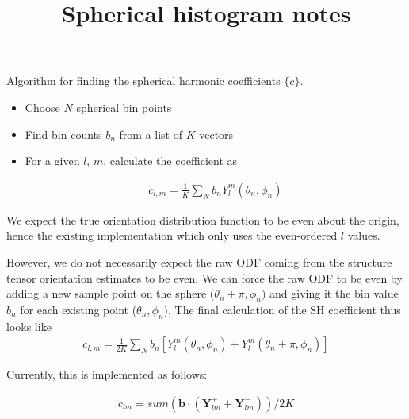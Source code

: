 \documentclass{article}
\title{Spherical histogram notes}
\date{}
\begin{document}
\maketitle

Algorithm for finding the spherical harmonic coefficients $\{c\}$. 

\begin{itemize}
\item Choose $N$ spherical bin points
\item Find bin counts $b_n$ from a list of $K$ vectors
\item For a given $l$, $m$, calculate the coefficient as
  
  \begin{align}
    c_{l,m} = \frac{1}{K}\sum_N b_n Y_{l}^{m}(\theta_n, \phi_n)
  \end{align}
\end{itemize}

We expect the true orientation distribution function to be even about the origin,
hence the existing implementation which only uses the even-ordered $l$ values.

However, we do not necessarily expect the raw ODF coming from the structure tensor
orientation estimates to be even. We can force the raw ODF to be even
by adding a new sample point on the sphere ($\theta_n +\pi, \phi_n)$ and giving it the
bin value $b_n$ for each existing point ($\theta_n, \phi_n$). The final calculation
of the SH coefficient thus looks like
\begin{align}
  c_{l,m} = \frac{1}{2K}\sum_N b_n \left[Y_{l}^{m}(\theta_n, \phi_n) + Y_l^m(\theta_n + \pi, \phi_n)\right]
\end{align}

Currently, this is implemented as follows:

\begin{align}
  \label{eq:1}
  c_{lm} = sum(\bm{b} \cdot (\bm{Y}_{lm}^{+} + \bm{Y}_{lm}^{-})) / 2K
\end{align}

  
  
\end{document}
